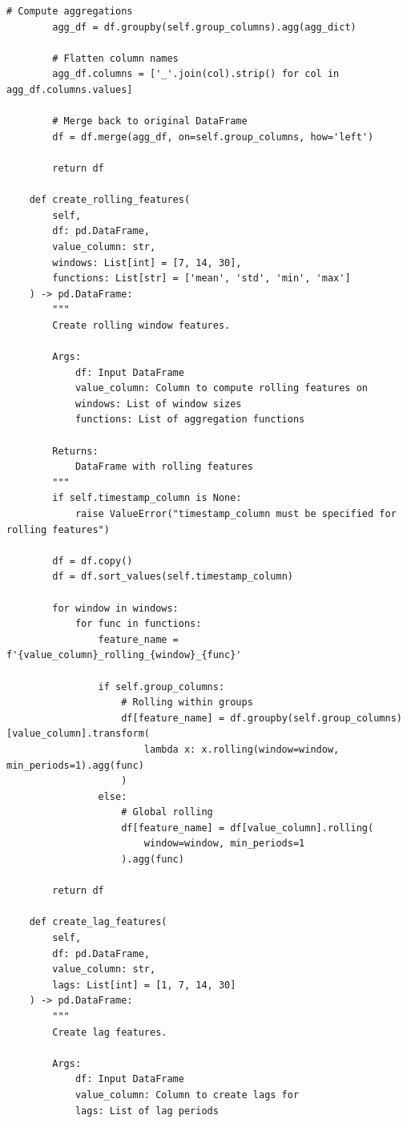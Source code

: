 \begin{lstlisting}[style=python, caption={Scalable Aggregation and Rolling Window Features}]
        # Compute aggregations
        agg_df = df.groupby(self.group_columns).agg(agg_dict)

        # Flatten column names
        agg_df.columns = ['_'.join(col).strip() for col in agg_df.columns.values]

        # Merge back to original DataFrame
        df = df.merge(agg_df, on=self.group_columns, how='left')

        return df

    def create_rolling_features(
        self,
        df: pd.DataFrame,
        value_column: str,
        windows: List[int] = [7, 14, 30],
        functions: List[str] = ['mean', 'std', 'min', 'max']
    ) -> pd.DataFrame:
        """
        Create rolling window features.

        Args:
            df: Input DataFrame
            value_column: Column to compute rolling features on
            windows: List of window sizes
            functions: List of aggregation functions

        Returns:
            DataFrame with rolling features
        """
        if self.timestamp_column is None:
            raise ValueError("timestamp_column must be specified for rolling features")

        df = df.copy()
        df = df.sort_values(self.timestamp_column)

        for window in windows:
            for func in functions:
                feature_name = f'{value_column}_rolling_{window}_{func}'

                if self.group_columns:
                    # Rolling within groups
                    df[feature_name] = df.groupby(self.group_columns)[value_column].transform(
                        lambda x: x.rolling(window=window, min_periods=1).agg(func)
                    )
                else:
                    # Global rolling
                    df[feature_name] = df[value_column].rolling(
                        window=window, min_periods=1
                    ).agg(func)

        return df

    def create_lag_features(
        self,
        df: pd.DataFrame,
        value_column: str,
        lags: List[int] = [1, 7, 14, 30]
    ) -> pd.DataFrame:
        """
        Create lag features.

        Args:
            df: Input DataFrame
            value_column: Column to create lags for
            lags: List of lag periods


\end{lstlisting}
